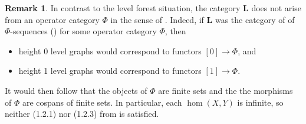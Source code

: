 \documentclass{amsart}
\numberwithin{theorem}{subsection}
\theoremstyle{definition}
\newtheorem{remark}[theorem]{Remark}
\newcommand{\levelg}{\mathbf{L}}
\begin{document}
\begin{remark}\label{remark level not phi seq}
In contrast to the level forest situation, the category $\levelg$ does not arise from an operator category $\Phi$ in the sense of \cite[Definition 1.2]{bar}. 
Indeed, if $\levelg$ was the category of of $\Phi$-sequences (\cite[Definition 2.4]{bar}) for some operator category $\Phi$, then
\begin{itemize}
\item height 0 level graphs would correspond to functors $[0] \to \Phi$, and
\item height 1 level graphs would correspond to functors $[1] \to \Phi$.
\end{itemize}
It would then follow that the objects of $\Phi$ are finite sets and the the morphisms of $\Phi$ are cospans of finite sets.
In particular, each $\hom(X,Y)$ is infinite, so neither (1.2.1) nor (1.2.3) from \cite{bar} is satisfied.
\end{remark}
\end{document}
